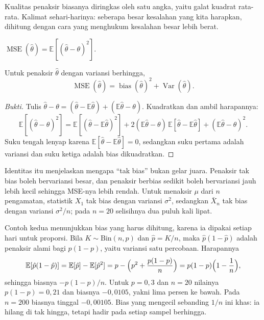 Kualitas penaksir biasanya diringkas oleh satu angka, yaitu galat kuadrat rata-rata.
Kalimat sehari-harinya: seberapa besar kesalahan yang kita harapkan, dihitung dengan
cara yang menghukum kesalahan besar lebih berat.

\begin{definisi}
$\operatorname{MSE}(\hat\theta)=\mathbb{E}[(\hat\theta-\theta)^2]$.
\end{definisi}

\begin{teorema}
Untuk penaksir $\hat\theta$ dengan variansi berhingga,
\[
\operatorname{MSE}(\hat\theta)=\operatorname{bias}(\hat\theta)^2
+\operatorname{Var}(\hat\theta).
\]
\end{teorema}

\begin{proof}[Bukti]
Tulis $\hat\theta-\theta=(\hat\theta-\mathbb{E}\hat\theta)
+(\mathbb{E}\hat\theta-\theta)$. Kuadratkan dan ambil harapannya:
\[
\mathbb{E}[(\hat\theta-\theta)^2]
=\mathbb{E}[(\hat\theta-\mathbb{E}\hat\theta)^2]
+2(\mathbb{E}\hat\theta-\theta)\,\mathbb{E}[\hat\theta-\mathbb{E}\hat\theta]
+(\mathbb{E}\hat\theta-\theta)^2 .
\]
Suku tengah lenyap karena $\mathbb{E}[\hat\theta-\mathbb{E}\hat\theta]=0$, sedangkan
suku pertama adalah variansi dan suku ketiga adalah bias dikuadratkan.
\end{proof}

Identitas itu menjelaskan mengapa ``tak bias'' bukan gelar juara. Penaksir tak bias
boleh bervariansi besar, dan penaksir berbias sedikit boleh bervariansi jauh lebih
kecil sehingga MSE-nya lebih rendah. Untuk menaksir $\mu$ dari $n$ pengamatan,
statistik $X_1$ tak bias dengan variansi $\sigma^2$, sedangkan $\bar X_n$ tak bias
dengan variansi $\sigma^2/n$; pada $n=20$ selisihnya dua puluh kali lipat.

Contoh kedua menunjukkan bias yang harus dihitung, karena ia dipakai setiap hari
untuk proporsi. Bila $K\sim\mathrm{Bin}(n,p)$ dan $\hat p=K/n$, maka
$\hat p(1-\hat p)$ adalah penaksir alami bagi $p(1-p)$, yaitu variansi satu percobaan.
Harapannya
\[
\mathbb{E}[\hat p(1-\hat p)]
=\mathbb{E}[\hat p]-\mathbb{E}[\hat p^2]
=p-\Bigl(p^2+\frac{p(1-p)}{n}\Bigr)
=p(1-p)\Bigl(1-\frac1n\Bigr),
\]
sehingga biasnya $-p(1-p)/n$. Untuk $p=0{,}3$ dan $n=20$ nilainya $p(1-p)=0{,}21$
dan biasnya $-0{,}0105$, yakni lima persen ke bawah. Pada $n=200$ biasnya tinggal
$-0{,}00105$. Bias yang mengecil sebanding $1/n$ ini khas: ia hilang di tak hingga,
tetapi hadir pada setiap sampel berhingga.

